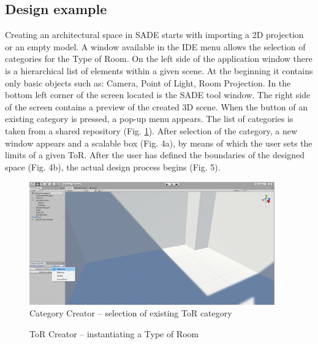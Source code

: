 \documentclass[runningheads]{llncs}
\begin{document}
\subsection{Design example}
Creating an architectural space in SADE starts with importing a 2D projection or an empty model. A window available in the IDE menu allows the selection of categories for the Type of Room. On the left side of the application window there is a hierarchical list of elements within a given scene. At the beginning it contains only basic objects such as: Camera, Point of Light, Room Projection. In the bottom left corner of the screen located is the SADE tool window. The right side of the screen contains a preview of the created 3D scene.  When the button of an existing category is pressed, a pop-up menu appears. The list of categories is taken from a shared repository (Fig. \ref{fig-category}). After selection of the category,  a new window appears and a scalable box (Fig. 4a), by means of which the user sets the limits of a given ToR. After the user has defined the boundaries of the designed space (Fig. 4b), the actual design process begins (Fig. 5).

\begin{figure}[H]
\centering
\includegraphics[width=\textwidth, height=5.3cm]{editor1.png}
\caption{Category Creator -- selection of existing ToR category} \label{fig-category}
\end{figure}

\begin{figure}
     \centering
     \hspace{0.5cm}
     \caption{ToR Creator -- instantiating a Type of Room}
     \label{fig-tor}
\end{figure}
\end{document}
